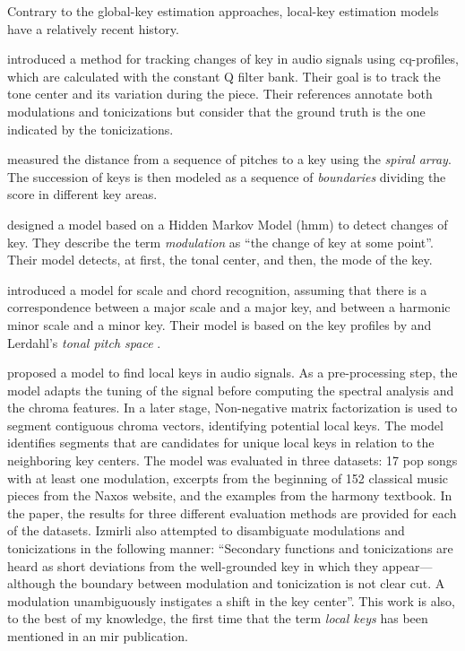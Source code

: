 


Contrary to the global-key estimation approaches, local-key
estimation models have a relatively recent history.

\textcite{purwins2000new} introduced a method for tracking
changes of key in audio signals using cq-profiles, which are
calculated with the constant Q filter bank. Their goal is to
track the tone center and its variation during the piece.
Their references annotate both modulations and tonicizations
but consider that the ground truth is the one indicated by
the tonicizations.

\textcite{chew2002spiral} measured the distance from a
sequence of pitches to a key using the \emph{spiral array}.
The succession of keys is then modeled as a sequence of
\emph{boundaries} dividing the score in different key areas.

\textcite{chai2005detection} designed a model based on a
Hidden Markov Model (\gls{hmm}) to detect changes of key.
They describe the term \emph{modulation} as ``the change of
key at some point''. Their model detects, at first, the
tonal center, and then, the mode of the key.

\textcite{catteau2007probabilistic} introduced a model for
scale and chord recognition, assuming that there is a
correspondence between a major scale and a major key, and
between a harmonic minor scale and a minor key. Their model
is based on the key profiles by
\textcite{temperley1999whats} and Lerdahl's \emph{tonal
pitch space} \parencite{lerdahl2005tonal}.

\textcite{izmirli2007localized} proposed a model to find
local keys in audio signals. As a pre-processing step, the
model adapts the tuning of the signal before computing the
spectral analysis and the chroma features. In a later stage,
Non-negative matrix factorization is used to segment
contiguous chroma vectors, identifying potential local keys.
The model identifies segments that are candidates for unique
local keys in relation to the neighboring key centers. The
model was evaluated in three datasets: 17 pop songs with at
least one modulation, excerpts from the beginning of 152
classical music pieces from the Naxos website, and the
examples from the \textcite{kostka1984tonal} harmony
textbook. In the paper, the results for three different
evaluation methods are provided for each of the datasets.
Izmirli also attempted to disambiguate modulations and
tonicizations in the following manner: ``Secondary functions
and tonicizations are heard as short deviations from the
well-grounded key in which they appear---although the
boundary between modulation and tonicization is not clear
cut. A modulation unambiguously instigates a shift in the
key center''. This work is also, to the best of my
knowledge, the first time that the term \emph{local keys}
has been mentioned in an \gls{mir} publication.

